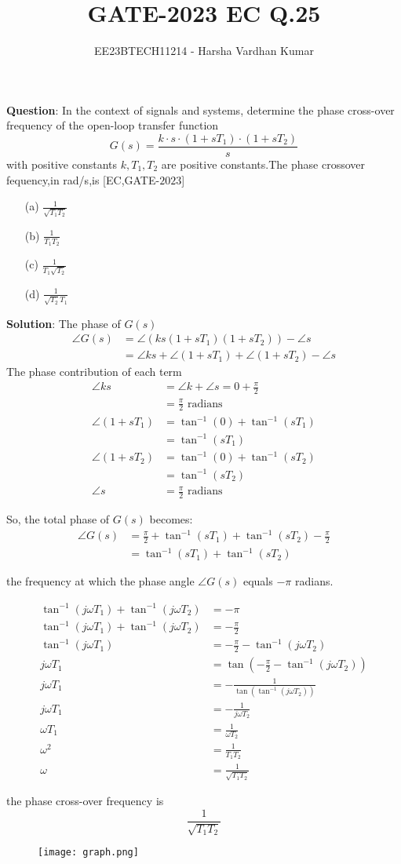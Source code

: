 \documentclass[journal,12pt,twocolumn]{IEEEtran}
\title{GATE-2023 EC Q.25}
\author{EE23BTECH11214 - Harsha Vardhan Kumar}
\begin{document}
\maketitle

\textbf{Question}:
In the context of signals and systems, determine the phase cross-over frequency of the open-loop transfer function
\[
G(s) = \frac{k \cdot s \cdot (1+sT_1) \cdot (1+sT_2)}{s}
\]
with positive constants $k, T_1, T_2$ are positive constants.The phase crossover fequency,in rad/s,is
\hfill [EC,GATE-$2023$]
\begin{enumerate}
  \item[(a)] $\frac{1}{\sqrt{T_1 T_2}}$
  \item[(b)] $\frac{1}{T_1 T_2}$
  \item[(c)] $\frac{1}{T_1\sqrt{T_2}}$
  \item[(d)] $\frac{1}{\sqrt{T_2}T_1}$
\end{enumerate}
\textbf{Solution}:
The phase of \( G(s) \)
\begin{align}
\angle G(s) &= \angle (ks(1+sT_1)(1+sT_2)) - \angle s \\
&= \angle ks + \angle (1+sT_1) + \angle (1+sT_2) - \angle s 
\end{align}
The phase contribution of each term
\begin{align}
\angle ks &= \angle k + \angle s = 0 + \frac{\pi}{2} \\
&= \frac{\pi}{2} \text{ radians} \\
\angle (1+sT_1) &= \tan^{-1}(0) + \tan^{-1}(sT_1) \\
&= \tan^{-1}(sT_1)  \\
\angle (1+sT_2) &= \tan^{-1}(0) + \tan^{-1}(sT_2)\\ 
&= \tan^{-1}(sT_2)  \\
\angle s &= \frac{\pi}{2} \text{ radians} 
\end{align}

So, the total phase of \( G(s) \) becomes:
\begin{align}
\angle G(s) &= \frac{\pi}{2} + \tan^{-1}(sT_1) + \tan^{-1}(sT_2) - \frac{\pi}{2}  \\
&= \tan^{-1}(sT_1) + \tan^{-1}(sT_2)
\end{align}

the frequency at which the phase angle \( \angle G(s) \) equals \( -\pi \) radians.

\begin{align}
\tan^{-1}(j\omega T_1) + \tan^{-1}(j\omega T_2) &= -\pi \\
\tan^{-1}(j\omega T_1) + \tan^{-1}(j\omega T_2) &= -\frac{\pi}{2} \\
\tan^{-1}(j\omega T_1) &= -\frac{\pi}{2} - \tan^{-1}(j\omega T_2) \\
j\omega T_1 &= \tan\left(-\frac{\pi}{2} - \tan^{-1}(j\omega T_2)\right) \\
j\omega T_1 &= -\frac{1}{\tan(\tan^{-1}(j\omega T_2))} \\
j\omega T_1 &= -\frac{1}{j\omega T_2} \\
\omega T_1 &= \frac{1}{\omega T_2} \\
\omega^2 &= \frac{1}{T_1 T_2} \\
\omega &= \frac{1}{\sqrt{T_1 T_2}}
\end{align}

the phase cross-over frequency is \[ {\frac{1}{\sqrt{T_1 T_2}}} \]
\begin{figure}[!ht] 
\centering
\texttt{[image: graph.png]}
\label{fig:Graph1}
\end{figure}
\end{document}
